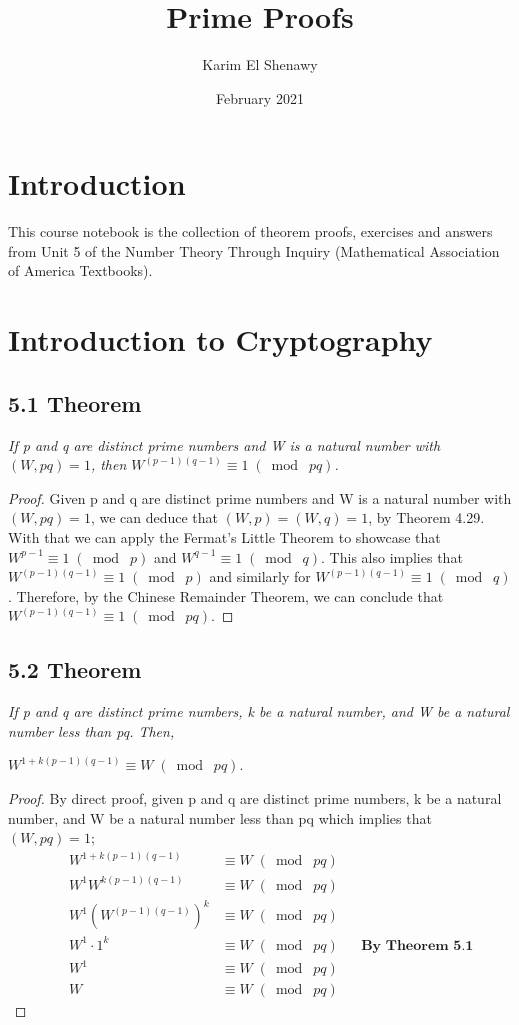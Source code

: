 \documentclass{article}
\title{Prime Proofs}
\author{Karim El Shenawy}
\date{February 2021}
\begin{document}
\maketitle

\section*{Introduction}
This course notebook is the collection of theorem proofs, exercises and answers from Unit 5 of the Number Theory Through Inquiry (Mathematical Association of America Textbooks).

\section*{Introduction to Cryptography}

\subsection*{5.1 Theorem} 
\quad \textit{If p and q are distinct prime numbers and W is a natural number with $(W, pq) = 1$, then $W^{(p-1)(q-1)} \equiv 1 \;(\bmod\; pq)$.}

\begin{proof}
Given p and q are distinct prime numbers and W is a natural number with $(W, pq) = 1$, we can deduce that $(W, p) = (W, q) = 1$, by Theorem 4.29. With that we can apply the Fermat's Little Theorem to showcase that $W^{p-1} \equiv 1 \;(\bmod\; p)$ and $W^{q-1} \equiv 1 \;(\bmod\; q)$. This also implies that $W^{(p-1)(q-1)} \equiv 1 \;(\bmod\; p)$ and similarly for $W^{(p-1)(q-1)} \equiv 1 \;(\bmod\; q)$. Therefore, by the Chinese Remainder Theorem, we can conclude that $W^{(p-1)(q-1)} \equiv 1 \;(\bmod\; pq)$. 
\end{proof}

\subsection*{5.2 Theorem} 
\quad \textit{If p and q are distinct prime numbers, k be a natural number, and W be a natural number less than pq. Then,}
\begin{center}
    $W^{1+k(p-1)(q-1)} \equiv W \;(\bmod\; pq)$.
\end{center}

\begin{proof}
By direct proof, given p and q are distinct prime numbers, k be a natural number, and W be a natural number less than pq which implies that $(W, pq) = 1$;
\begin{align*}
    &&W^{1+k(p-1)(q-1)} &\equiv W \;(\bmod\; pq) &&\\
    &&W^1W^{k(p-1)(q-1)} &\equiv W \;(\bmod\; pq) &&\\
    &&W^1(W^{(p-1)(q-1)})^{k} &\equiv W \;(\bmod\; pq) &&\\
    &&W^1\cdot1^{k} &\equiv W \;(\bmod\; pq) && \textbf{By Theorem 5.1}\\
    &&W^1 &\equiv W \;(\bmod\; pq) &&\\
    &&W &\equiv W \;(\bmod\; pq) &&
\end{align*}
\end{proof}
\end{document}
